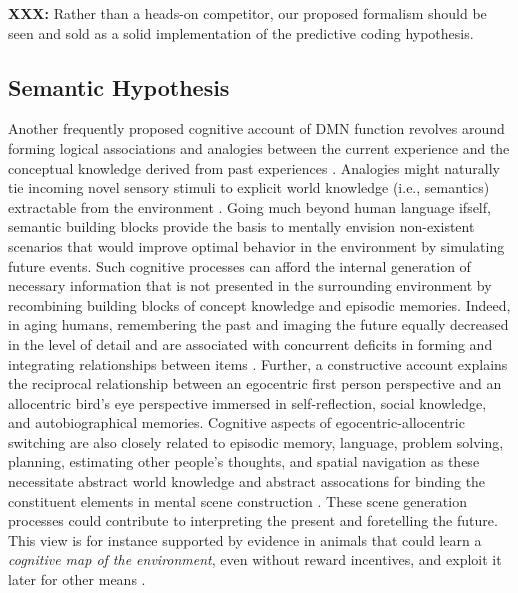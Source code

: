 \documentclass[10pt,letterpaper]{article}
\begin{document}
\begin{mdframed}
  \textbf{XXX:} Rather than a heads-on competitor, our proposed formalism should be seen
  and sold as a solid implementation of the predictive coding hypothesis.
\end{mdframed}
\subsection{Semantic Hypothesis}
Another frequently proposed cognitive account of DMN function revolves
around forming logical associations and analogies between
the current experience and
the conceptual knowledge derived from past experiences
\citep{bar2007proactive, binder1999conceptual}.
Analogies might naturally tie incoming novel sensory stimuli to
explicit world knowledge (i.e., semantics) extractable from the environment
\citep{bar2009proactive}.
%
Going much beyond human language ifself,
semantic building blocks provide the basis to mentally envision non-existent scenarios
that would improve optimal behavior in the environment
by simulating future events.
Such cognitive processes can afford
the internal generation of necessary information
that is not presented in the surrounding environment
by recombining building blocks of
concept knowledge and episodic memories.
Indeed, in aging humans, remembering the past and imaging the future
equally decreased in the level of detail and are associated with
concurrent deficits in forming and integrating relationships between
items \citep{addis2008age, spreng2006temporal}.
Further,
a constructive account explains the reciprocal relationship
between an egocentric first person perspective and
an allocentric bird’s eye perspective immersed in
self-reflection, social knowledge, and autobiographical memories.
%
Cognitive aspects of egocentric-allocentric switching
are also closely related to episodic memory, language, problem solving,
planning, estimating other people's thoughts, and spatial navigation
as these necessitate abstract world knowledge and abstract assocations
for binding the constituent elements in mental scene construction
\citep{schacter2007remembering}.
These scene generation processes could contribute to interpreting the
present and foretelling the future.
This view is for instance supported by evidence in animals that
could learn a \textit{cognitive map of the environment},
even without reward incentives, and exploit it later
for other means \citep{tolman1948cognitive}.
\end{document}
